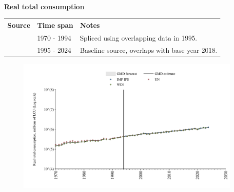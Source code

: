 \documentclass[12pt,a4paper,landscape]{article}
\begin{document}
\begin{adjustbox}{max totalsize={\paperwidth}{\paperheight},center}
\begin{minipage}[t][\textheight][t]{\textwidth}
\vspace*{0.5cm}
{}
\begin{center}
{\Large\bfseries Real total consumption}
\end{center}
\vspace{0.5cm}
\begin{table}[H]
\centering
\small
\begin{tabular}{|l|l|l|}
\hline
\textbf{Source} & \textbf{Time span} & \textbf{Notes} \\
\hline
\rowcolor{white}\cite{WDI}& 1970 - 1994 &Spliced using overlapping data in 1995. \\
\rowcolor{lightgray}\cite{IMF_IFS}& 1995 - 2024 &Baseline source, overlaps with base year 2018. \\
\hline
\end{tabular}
\end{table}
\begin{figure}[H]
\centering
\includegraphics[width=\textwidth,height=0.6\textheight,keepaspectratio]{graphs/ISR_rcons.pdf}
\end{figure}
\end{minipage}
\end{adjustbox}
\end{document}
